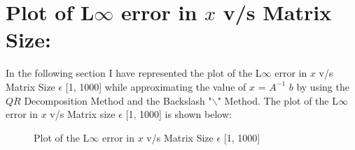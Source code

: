 \documentclass[12pt,a4paper]{article}
\begin{document}
\section{Plot of L$\infty$ error in $x$ v/s Matrix Size:}
In the following section I have represented the plot of the L$\infty$ error in $x$ v/s Matrix Size  $\epsilon$ [1, 1000] while approximating the value of $x$ = $A^{-1}$ $b$ by using the $QR$ Decomposition Method and the Backslash "$\backslash$" Method. The plot of the L$\infty$ error in $x$ v/s Matrix size  $\epsilon$ [1, 1000] is shown below:
\begin{figure}[!ht]
	\begin{center}
	\end{center}
	\caption{Plot of the L$\infty$ error in $x$ v/s Matrix Size  $\epsilon$ [1, 1000]}
\end{figure}
\end{document}
